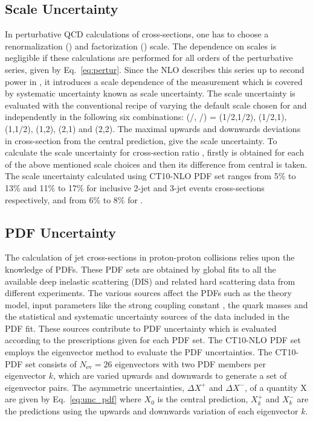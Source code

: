 \subsection{Scale Uncertainty}
\label{sec:scale_unc}
In perturbative QCD calculations of cross-sections, one has to choose a renormalization (\mur) and factorization (\muf) scale. The dependence on scales is negligible if these calculations are performed for all orders of the perturbative series, given by Eq.~\ref{eq:pertur}. Since the NLO describes this series up to second power in \alps, it introduces a scale dependence of the measurement which is covered by systematic uncertainty known as scale uncertainty. The scale uncertainty is evaluated with the conventional recipe of varying the default scale \httwo chosen for \mur and \muf independently in the following six combinations: (\mur/\httwo, \muf/\httwo) = (1/2,1/2), (1/2,1), (1,1/2), (1,2), (2,1) and (2,2). The maximal upwards and downwards deviations in cross-section from the central prediction, give the scale uncertainty. To calculate the scale uncertainty for cross-section ratio \ratio, firstly \ratio is obtained for each of the above mentioned scale choices and then its difference from central \ratio is taken. The scale uncertainty calculated using CT10-NLO PDF set ranges from 5\% to 13\% and 11\% to 17\% for inclusive 2-jet and 3-jet events cross-sections respectively, and from 6\% to 8\% for \ratio.

\subsection{PDF Uncertainty}
\label{sec:pdf_unc}
The calculation of jet cross-sections in proton-proton collisions relies upon the knowledge of PDFs. These PDF sets are obtained by global fits to all the available deep inelastic scattering (DIS) and related hard scattering data from different experiments. The various sources affect the PDFs such as the theory model, input parameters like the strong coupling constant \alpsns, the quark masses and the statistical and systematic uncertainty sources of the data included in the PDF fit. These sources contribute to PDF uncertainty which is evaluated according to the prescriptions given for each PDF set. The CT10-NLO PDF set \cite{Lai:2010vv,Pumplin:2002vw} employs the eigenvector method to evaluate the PDF uncertainties. The CT10-PDF set consists of $N_\mathrm{ev}=26$ eigenvectors with two PDF members per eigenvector $k$, which are varied upwards and downwards to generate a set of eigenvector pairs. The asymmetric uncertainties, $\Delta X^{+}$ and $\Delta X^{-}$, of a quantity X are given by Eq.~\ref{eq:unc_pdf} where $X_0$ is the central prediction, $X^{+}_k$ and $X^{-}_k$ are the predictions using the upwards and downwards variation of each eigenvector $k$. 

